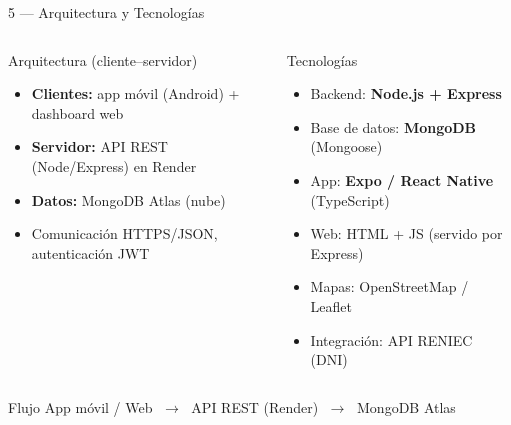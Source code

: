 \documentclass[aspectratio=169, 11pt]{beamer}
\begin{document}
\begin{frame}{5 — Arquitectura y Tecnologías}
    \vspace{-0.3cm}
    \begin{columns}[T]
    \begin{block}{Arquitectura (cliente–servidor)}
        \scriptsize
        \begin{itemize}
            \item \textbf{Clientes:} app móvil (Android) + dashboard web
            \item \textbf{Servidor:} API REST (Node/Express) en Render
            \item \textbf{Datos:} MongoDB Atlas (nube)
            \item Comunicación HTTPS/JSON, autenticación JWT
        \end{itemize}
    \end{block}

    \begin{block}{Tecnologías}
        \scriptsize
        \begin{itemize}
            \item Backend: \textbf{Node.js + Express}
            \item Base de datos: \textbf{MongoDB} (Mongoose)
            \item App: \textbf{Expo / React Native} (TypeScript)
            \item Web: HTML + JS (servido por Express)
            \item Mapas: OpenStreetMap / Leaflet
            \item Integración: API RENIEC (DNI)
        \end{itemize}
    \end{block}
    \end{columns}
    \vspace{0.1cm}
    \begin{block}{Flujo}
        \centering\scriptsize
        App móvil / Web $\;\longrightarrow\;$ API REST (Render) $\;\longrightarrow\;$ MongoDB Atlas
    \end{block}
\end{frame}
\end{document}
